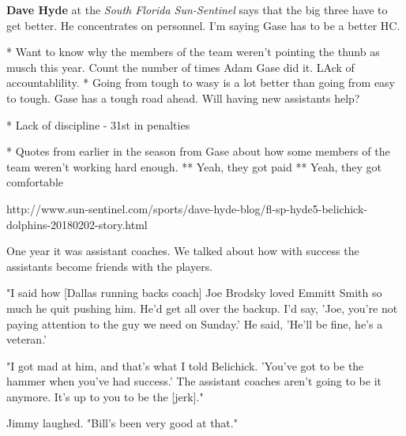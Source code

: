 \documentclass[11pt]{article}
\begin{document}
\textbf{Dave Hyde} at the \textit{South Florida Sun-Sentinel} says that the big three have to get better.  He concentrates on personnel.  I'm saying Gase has to be a better HC.

* Want to know why the members of the team weren't pointing the thunb as musch this year.  Count the number of times Adam Gase did it.  LAck of accountablility.
* Going from tough to wasy is a lot better than going from easy to tough.  Gase has a tough road ahead.  Will having new assistants help?

* Lack of discipline - 31st in penalties

* Quotes from earlier in the season from Gase about how some members of the team weren't working hard enough.
** Yeah, they got paid
** Yeah, they got comfortable


http://www.sun-sentinel.com/sports/dave-hyde-blog/fl-sp-hyde5-belichick-dolphins-20180202-story.html

One year it was assistant coaches. We talked about how with success the assistants become friends with the players.

"I said how [Dallas running backs coach] Joe Brodsky loved Emmitt Smith so much he quit pushing him. He'd get all over the backup. I'd say, 'Joe, you're not paying attention to the guy we need on Sunday.' He said, 'He'll be fine, he's a veteran.'

"I got mad at him, and that's what I told Belichick. 'You've got to be the hammer when you've had success.' The assistant coaches aren't going to be it anymore. It's up to you to be the [jerk]."

Jimmy laughed. "Bill's been very good at that."



  
\end{document}
